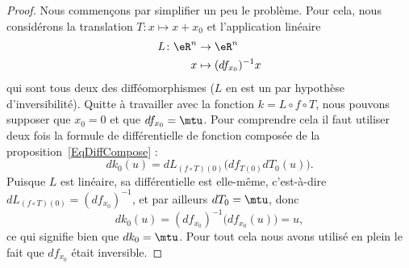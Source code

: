 \begin{proof}
	Nous commençons par simplifier un peu le problème. Pour cela, nous considérons la translation \( T\colon x\mapsto x+x_0 \) et l'application linéaire
	\begin{equation}
		\begin{aligned}
			L\colon \eR^n & \to \eR^n                \\
			x             & \mapsto (df_{x_0})^{-1}x
		\end{aligned}
	\end{equation}
	qui sont tous deux des difféomorphismes (\( L\) en est un par hypothèse d'inversibilité). Quitte à travailler avec la fonction \( k=L\circ f\circ T\), nous pouvons supposer que \( x_0=0\) et que \( df_{x_0}=\mtu\). Pour comprendre cela il faut utiliser deux fois la formule de différentielle de fonction composée de la proposition~\ref{EqDiffCompose} :
	\begin{equation}
		dk_0(u)=dL_{(f\circ T)(0)}\Big( df_{T(0)}dT_0(u) \Big).
	\end{equation}
	Puisque \( L\) est linéaire, sa différentielle est elle-même, c'est-à-dire \( dL_{(f\circ T)(0)}=(df_{x_0})^{-1}\), et par ailleurs \( dT_0=\mtu\), donc
	\begin{equation}
		dk_0(u)=(df_{x_0})^{-1}\Big( df_{x_0}(u) \Big)=u,
	\end{equation}
	ce qui signifie bien que \( dk_0=\mtu\). Pour tout cela nous avons utilisé en plein le fait que \( df_{x_0}\) était inversible.


\end{proof}
